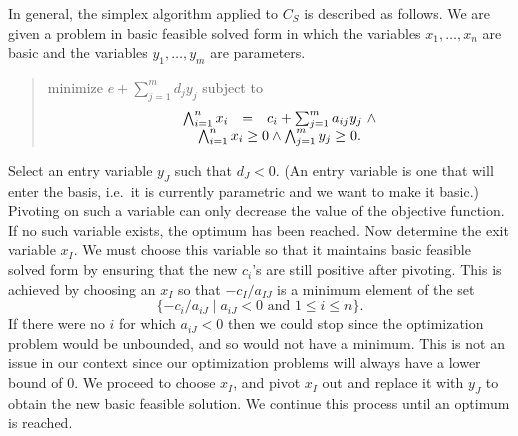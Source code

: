 \documentclass{uist96}
\begin{document}


In general, the simplex algorithm applied to $C_S$ 
is described as follows. 
We are given a problem in basic feasible solved form in which 
the variables $x_1, \ldots ,x_n$ are basic and the variables
$y_1, \ldots ,y_m$ are parameters.
\begin{quote}\vspace*{-1ex}
minimize $e + \sum_{j=1}^{m} d_j y_j$
subject to 
$$
\begin{array}{rcr}
        \bigwedge_{i=1}^{n} x_i & = & c_i + \sum_{j=1}^{m} a_{ij} y_j ~\wedge\\
                  \multicolumn{3}{c}{\bigwedge_{i=1}^{n} x_i \ge 0 \wedge
		  \bigwedge_{j=1}^{m} y_j \ge 0. }
            \end{array}
$$
\end{quote}\vspace{-0.9ex}
Select an entry variable $y_J$ such that $d_J < 0$\@.  (An entry variable is
one that will enter the basis, i.e.\ it is currently parametric and we want
to make it basic.)
Pivoting on such a variable can only decrease the value of the objective
function.
If no such variable exists, the optimum has been reached.
Now determine the exit variable $x_I$\@.  We must choose this variable so that
it maintains  basic feasible solved form by ensuring 
that the new $c_i$'s are still positive after pivoting. 
This is achieved by choosing an $x_I$ 
so that $- c_I/ a_{IJ}$ is a minimum element
of the set
$$
\{ -c_i/a_{iJ} \mid a_{iJ} < 0 \mbox{ and } 1 \le i \le n \}.
$$
If there were no $i$ for which $a_{iJ} < 0$ then we could stop since the
optimization problem would be unbounded, and so would not have
a minimum.  This is not an issue in our context since our
optimization problems will always have a lower bound of 0.
We proceed to choose $x_I$, and pivot $x_I$ out and replace it with $y_J$
to obtain the new basic feasible solution.
We continue this process until an optimum is reached.
\end{document}
